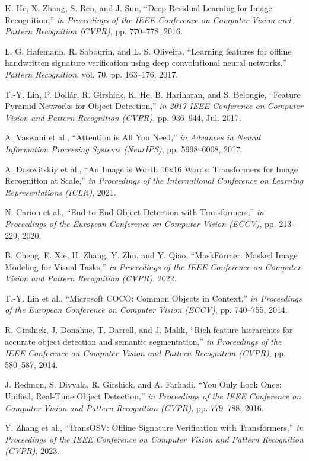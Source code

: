 \documentclass{article}
\begin{document}
\begin{thebibliography}{10}
	K. He, X. Zhang, S. Ren, and J. Sun,
	``Deep Residual Learning for Image Recognition,''
	\emph{in Proceedings of the IEEE Conference on Computer Vision and Pattern Recognition (CVPR)},
	pp. 770--778, 2016.

	L. G. Hafemann, R. Sabourin, and L. S. Oliveira,
	``Learning features for offline handwritten signature verification using deep convolutional neural networks,''
	\emph{Pattern Recognition},
	vol. 70, pp. 163--176, 2017.

	T.-Y. Lin, P. Dollár, R. Girshick, K. He, B. Hariharan, and S. Belongie,
	``Feature Pyramid Networks for Object Detection,''
	\emph{in 2017 IEEE Conference on Computer Vision and Pattern Recognition (CVPR)},
	pp. 936--944, Jul. 2017.

	A. Vaswani et al.,
	``Attention is All You Need,''
	\emph{in Advances in Neural Information Processing Systems (NeurIPS)},
	pp. 5998--6008, 2017.

	A. Dosovitskiy et al.,
	“An Image is Worth 16x16 Words: Transformers for Image Recognition at Scale,”
	\emph{in Proceedings of the International Conference on Learning Representations (ICLR)},
	2021.

	N. Carion et al.,
	``End-to-End Object Detection with Transformers,''
	\emph{in Proceedings of the European Conference on Computer Vision (ECCV)},
	pp. 213--229, 2020.

	B. Cheng, E. Xie, H. Zhang, Y. Zhu, and Y. Qiao,
	``MaskFormer: Masked Image Modeling for Visual Tasks,''
	\emph{in Proceedings of the IEEE Conference on Computer Vision and Pattern Recognition (CVPR)},
	2022.

	T.-Y. Lin et al.,
	``Microsoft COCO: Common Objects in Context,''
	\emph{in Proceedings of the European Conference on Computer Vision (ECCV)},
	pp. 740--755, 2014.

	R. Girshick, J. Donahue, T. Darrell, and J. Malik,
	``Rich feature hierarchies for accurate object detection and semantic segmentation,''
	\emph{in Proceedings of the IEEE Conference on Computer Vision and Pattern Recognition (CVPR)},
	pp. 580--587, 2014.

	J. Redmon, S. Divvala, R. Girshick, and A. Farhadi,
	``You Only Look Once: Unified, Real-Time Object Detection,''
	\emph{in Proceedings of the IEEE Conference on Computer Vision and Pattern Recognition (CVPR)},
	pp. 779--788, 2016.

	Y. Zhang et al.,
	``TransOSV: Offline Signature Verification with Transformers,''
	\emph{in Proceedings of the IEEE Conference on Computer Vision and Pattern Recognition (CVPR)},
	2023.


\end{thebibliography}
\end{document}
